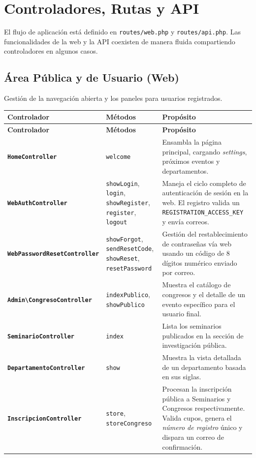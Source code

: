 \documentclass{article}
\begin{document}
\section{Controladores, Rutas y API}

El flujo de aplicación está definido en \texttt{routes/web.php} y \texttt{routes/api.php}. Las funcionalidades de la web y la API coexisten de manera fluida compartiendo controladores en algunos casos.

\subsection{Área Pública y de Usuario (Web)}

Gestión de la navegación abierta y los paneles para usuarios registrados.

\begin{longtable}{>{\raggedright\arraybackslash}p{4cm} >{\raggedright\arraybackslash}p{4cm} >{\raggedright\arraybackslash}p{7cm}}
\toprule
\textbf{Controlador} & \textbf{Métodos} & \textbf{Propósito} \\
\midrule
\endfirsthead
\toprule
\textbf{Controlador} & \textbf{Métodos} & \textbf{Propósito} \\
\midrule
\endhead
\bottomrule
\endfoot
\bottomrule
\endlastfoot
\textbf{\texttt{HomeController}} & \texttt{welcome} & Ensambla la página principal, cargando \textit{settings}, próximos eventos y departamentos. \\
\textbf{\texttt{WebAuthController}} & \texttt{showLogin}, \texttt{login}, \texttt{showRegister}, \texttt{register}, \texttt{logout} & Maneja el ciclo completo de autenticación de sesión en la web. El registro valida un \texttt{REGISTRATION\_ACCESS\_KEY} y envía correos. \\
\textbf{\texttt{WebPasswordResetController}} & \texttt{showForgot}, \texttt{sendResetCode}, \texttt{showReset}, \texttt{resetPassword} & Gestión del restablecimiento de contraseñas vía web usando un código de 8 dígitos numérico enviado por correo. \\
\textbf{\texttt{Admin\textbackslash CongresoController}} & \texttt{indexPublico}, \texttt{showPublico} & Muestra el catálogo de congresos y el detalle de un evento específico para el usuario final. \\
\textbf{\texttt{SeminarioController}} & \texttt{index} & Lista los seminarios publicados en la sección de investigación pública. \\
\textbf{\texttt{DepartamentoController}} & \texttt{show} & Muestra la vista detallada de un departamento basada en sus siglas. \\
\textbf{\texttt{InscripcionController}} & \texttt{store}, \texttt{storeCongreso} & Procesan la inscripción pública a Seminarios y Congresos respectivamente. Valida cupos, genera el \textit{número de registro} único y dispara un correo de confirmación. \\
\end{longtable}
\end{document}
